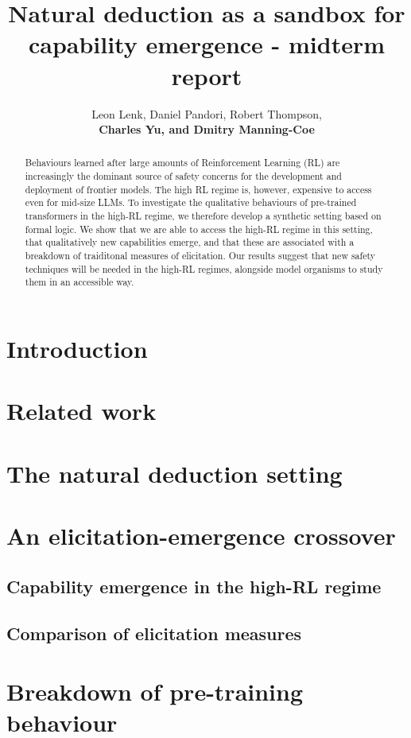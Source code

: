 \documentclass{article}
\title{Natural deduction as a sandbox for capability emergence - midterm report}
\author{%
  Leon Lenk, Daniel Pandori, Robert Thompson, \\
  \textbf{Charles Yu, and Dmitry Manning-Coe}
}
\begin{document}
\maketitle
\thispagestyle{fancy}


\begin{abstract}
  Behaviours learned after large amounts of Reinforcement Learning (RL) are increasingly the dominant source of safety concerns for the development and deployment of frontier models. The high RL regime is, however, expensive to access even for mid-size LLMs. To investigate the qualitative behaviours of pre-trained transformers in the high-RL regime, we therefore develop a synthetic setting based on formal logic. We show that we are able to access the high-RL regime in this setting, that qualitatively new capabilities emerge, and that these are associated with a breakdown of traiditonal measures of elicitation. Our results suggest that new safety techniques will be needed in the high-RL regimes, alongside model organisms to study them in an accessible way.
\end{abstract}


\section{Introduction}

\section{Related work}

\section{The natural deduction setting}

\section{An elicitation-emergence crossover}
\subsection{Capability emergence in the high-RL regime}
\subsection{Comparison of elicitation measures}
\section{Breakdown of pre-training behaviour}
\end{document}
